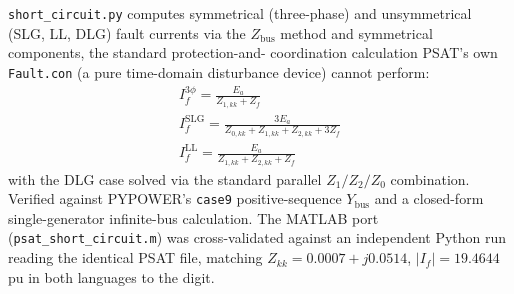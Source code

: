\documentclass[11pt]{report}
\newcommand{\pkg}[1]{\texttt{#1}}
\theoremstyle{plain}
\theoremstyle{definition}
\theoremstyle{remark}
\begin{document}
\pkg{short\_\hspace{0pt}circuit.py} computes symmetrical (three-phase) and
unsymmetrical (SLG, LL, DLG) fault currents via the $Z_{\text{bus}}$
method and symmetrical components, the standard protection-and-
coordination calculation PSAT's own \texttt{Fault.con} (a pure
time-domain disturbance device) cannot perform:
\begin{gather}
I_f^{3\phi} = \frac{E_a}{Z_{1,kk}+Z_f} \\
I_f^{\text{SLG}} = \frac{3E_a}{Z_{0,kk}+Z_{1,kk}+Z_{2,kk}+3Z_f} \\
I_f^{\text{LL}} = \frac{E_a}{Z_{1,kk}+Z_{2,kk}+Z_f}
\end{gather}
with the DLG case solved via the standard parallel $Z_1/Z_2/Z_0$
combination. Verified against PYPOWER's \texttt{case9} positive-sequence
$Y_{\text{bus}}$ and a closed-form single-generator infinite-bus
calculation. The MATLAB port (\pkg{psat\_\hspace{0pt}short\_\hspace{0pt}circuit.m}) was
cross-validated against an independent Python run reading the identical
PSAT file, matching $Z_{kk}=0.0007+j0.0514$, $\left|I_f\right|=19.4644$\,pu in both
languages to the digit.
\end{document}
